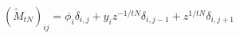 \begin{equation}
(\tilde{M}_{tN})_{ij} = \phi_i \delta_{i,j} + y_{i} z^{-1/tN} \delta_{i, j-1} +z^{1/tN} \delta_{i,j+1}
\end{equation}

